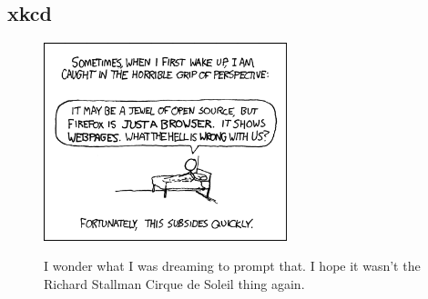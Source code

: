 \documentclass{beamer}
\begin{document}
\subsection{xkcd}
\begin{frame}[plain]
  \begin{figure}
    \begin{center}
      \includegraphics[width=200pt]{perspective}
    \end{center}
    {\tiny I wonder what I was dreaming to prompt that. I hope it wasn't the Richard Stallman Cirque de Soleil thing again.}
  \end{figure}
\end{frame}
\end{document}
